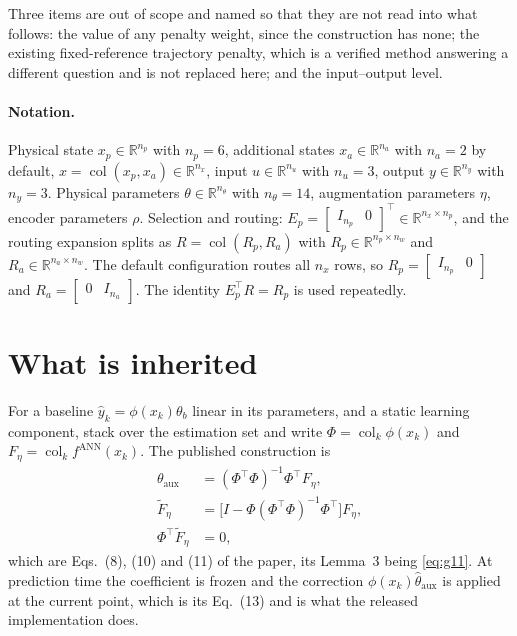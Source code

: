 \documentclass[11pt,a4paper]{article}
\newcommand{\R}{\mathbb R}
\newcommand{\col}{\operatorname{col}}
\theoremstyle{remark}
\begin{document}
Three items are out of scope and named so that they are not read into what follows: the value of
any penalty weight, since the construction has none; the existing fixed-reference trajectory
penalty, which is a verified method answering a different question and is not replaced here; and
the input--output level.

\paragraph{Notation.}
Physical state $x_p\in\R^{n_p}$ with $n_p=6$, additional states $x_a\in\R^{n_a}$ with $n_a=2$ by
default, $x=\col(x_p,x_a)\in\R^{n_x}$, input $u\in\R^{n_u}$ with $n_u=3$, output $y\in\R^{n_y}$
with $n_y=3$. Physical parameters $\theta\in\R^{n_\theta}$ with $n_\theta=14$, augmentation
parameters $\eta$, encoder parameters $\rho$. Selection and routing:
$E_p=\begin{bmatrix}I_{n_p}&0\end{bmatrix}^\top\in\R^{n_x\times n_p}$, and the routing expansion
splits as $R=\col(R_p,R_a)$ with $R_p\in\R^{n_p\times n_w}$ and $R_a\in\R^{n_a\times n_w}$. The
default configuration routes all $n_x$ rows, so $R_p=\begin{bmatrix}I_{n_p}&0\end{bmatrix}$ and
$R_a=\begin{bmatrix}0&I_{n_a}\end{bmatrix}$. The identity $E_p^\top R=R_p$ is used repeatedly.

\section{What is inherited}\label{sec:inherited}

For a baseline $\hat y_k=\phi(x_k)\theta_b$ linear in its parameters, and a static learning
component, stack over the estimation set and write $\Phi=\col_k\phi(x_k)$ and
$F_\eta=\col_k f^{\mathrm{ANN}}(x_k)$. The published construction is
\begin{align}
 \theta_{\mathrm{aux}}&=(\Phi^\top\Phi)^{-1}\Phi^\top F_\eta, \label{eq:g8}\\
 \widetilde F_\eta&=\bigl[I-\Phi(\Phi^\top\Phi)^{-1}\Phi^\top\bigr]F_\eta,\label{eq:g10}\\
 \Phi^\top\widetilde F_\eta&=0,\label{eq:g11}
\end{align}
which are Eqs.~(8), (10) and (11) of the paper, its Lemma~3 being \eqref{eq:g11}. At prediction
time the coefficient is frozen and the correction $\phi(x_k)\hat\theta_{\mathrm{aux}}$ is applied
at the current point, which is its Eq.~(13) and is what the released implementation does.
\end{document}
